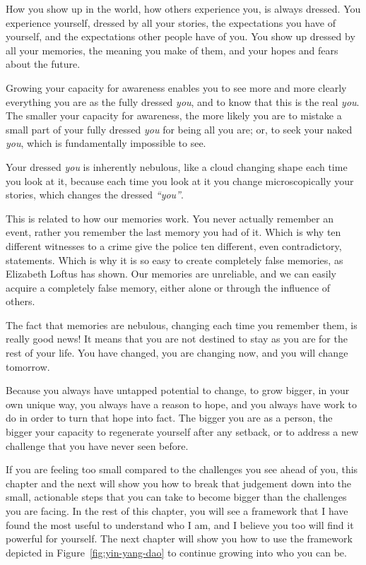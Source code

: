 How you show up in the world, how others experience you, is always dressed. You experience yourself, dressed by all your stories, the expectations you have of yourself, and the expectations other people have of you. You show up dressed by all your memories, the meaning you make of them, and your hopes and fears about the future.


Growing your capacity for awareness enables you to see more and more clearly everything you are as the fully dressed \emph{you}, and to know that this is the real \emph{you}. The smaller your capacity for awareness, the more likely you are to mistake a small part of your fully dressed \emph{you} for being all you are; or, to seek your naked \emph{you}, which is fundamentally impossible to see.


Your dressed \emph{you} is inherently nebulous, like a cloud changing shape each time you look at it, because each time you look at it you change microscopically your stories, which changes the dressed \emph{“you”}.


This is related to how our memories work. You never actually remember an event, rather you remember the last memory you had of it. Which is why ten different witnesses to a crime give the police ten different, even contradictory, statements. Which is why it is so easy to create completely false memories, as Elizabeth Loftus\cite{loftus-false-memory-ted,loftus-false-memory-wiki}  has shown. Our memories are unreliable, and we can easily acquire a completely false memory, either alone or through the influence of others.


The fact that memories are nebulous, changing each time you remember them, is really good news! It means that you are not destined to stay as you are for the rest of your life. You have changed, you are changing now, and you will change tomorrow.


Because you always have untapped potential to change, to grow bigger, in your own unique way, you always have a reason to hope, and you always have work to do in order to turn that hope into fact. The bigger you are as a person, the bigger your capacity to regenerate yourself after any setback, or to address a new challenge that you have never seen before. 


If you are feeling too small compared to the challenges you see ahead of you, this chapter and the next will show you how to break that judgement down into the small, actionable steps that you can take to become bigger than the challenges you are facing. In the rest of this chapter, you will see a framework that I have found the most useful to understand who I am, and I believe you too will find it powerful for yourself. The next chapter will show you how to use the framework depicted in Figure~\ref{fig:yin-yang-dao} to continue growing into who you can be.


